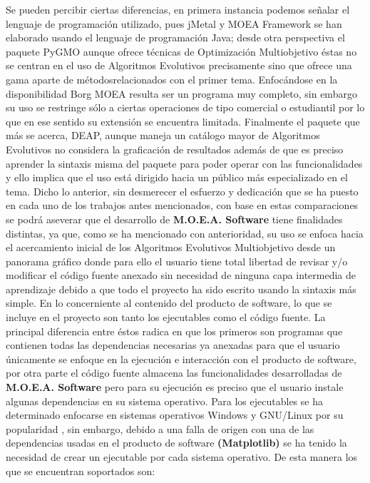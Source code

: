 \documentclass[class=report, crop=false]{standalone}
\begin{document}
Se pueden percibir ciertas diferencias, en primera instancia 
podemos señalar el lenguaje de programación utilizado, pues 
jMetal y MOEA Framework se han elaborado usando el lenguaje 
de programación Java; desde otra perspectiva el paquete PyGMO 
aunque ofrece técnicas de Optimización Multiobjetivo éstas no 
se centran en el uso de Algoritmos Evolutivos precisamente sino 
que ofrece una gama aparte de métodosrelacionados con el primer 
tema.\break
Enfocándose en la disponibilidad Borg MOEA resulta ser un 
programa muy completo, sin embargo su uso se restringe sólo a 
ciertas operaciones de tipo comercial o estudiantil por lo que 
en ese sentido su extensión se encuentra limitada.\break
Finalmente el paquete que más se acerca, DEAP, aunque maneja un 
catálogo mayor de Algoritmos Evolutivos no considera la 
graficación de resultados además de que es preciso aprender la 
sintaxis misma del paquete para poder operar con las funcionalidades 
y ello implica que el uso está dirigido hacia un público más 
especializado en el tema.\medskip\break
Dicho lo anterior, sin desmerecer el esfuerzo y dedicación que 
se ha puesto en cada uno de los trabajos antes mencionados, 
con base en estas comparaciones se podrá aseverar que el desarrollo 
de \textbf{M.O.E.A. Software} tiene finalidades distintas, ya 
que, como se ha mencionado con anterioridad, su uso se enfoca 
hacia el acercamiento inicial de los Algoritmos Evolutivos 
Multiobjetivo desde un panorama gráfico donde para ello el usuario 
tiene total libertad de revisar y/o modificar el código fuente 
anexado sin necesidad de ninguna capa intermedia de aprendizaje 
debido a que todo el proyecto ha sido escrito usando la sintaxis 
más simple.\medskip\break
En lo concerniente al contenido del producto de software, lo que 
se incluye en el proyecto son tanto los ejecutables como el código 
fuente.\break 
La principal diferencia entre éstos radica en que los primeros 
son programas que contienen todas las dependencias necesarias 
ya anexadas para que el usuario únicamente se enfoque en la 
ejecución e interacción con el producto de software, por otra 
parte el código fuente almacena las funcionalidades desarrolladas 
de \textbf{M.O.E.A. Software} pero para su ejecución es preciso 
que el usuario instale algunas dependencias en su sistema 
operativo.\medskip\break
Para los ejecutables se ha determinado enfocarse en sistemas 
operativos Windows y GNU/Linux por su popularidad \cite{b8}, 
sin embargo, debido a una falla de origen con una de las 
dependencias usadas en el producto de software \textbf{(Matplotlib)} 
se ha tenido la necesidad de crear un ejecutable por cada 
sistema operativo. De esta manera los que se encuentran soportados 
son:
\end{document}
